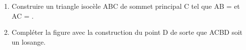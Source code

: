 \begin{exercice*} %
   \begin{enumerate}
      \item Construire un triangle isocèle ABC de sommet principal C tel que AB =  et AC = .
      \item Compléter la figure avec la construction du point D de sorte que ACBD soit un losange.
   \end{enumerate}
\end{exercice*}
